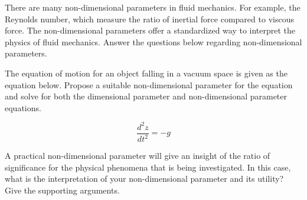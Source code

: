 \question{}\label{Q}

\listbeginx	%

	\item \label{a} There are many non-dimensional parameters in fluid mechanics. For example, the Reynolds number, which measure the ratio of inertial force compared to viscous force. The non-dimensional parameters offer a standardized way to interpret the physics of fluid mechanics. Answer the questions below regarding non-dimensional parameters.  
	
		
		\listbegin

\item \label{i} The equation of motion for an object falling in a vacuum space is given as the equation below. Propose a suitable non-dimensional parameter for the equation and solve for both the dimensional parameter and non-dimensional parameter equations.


\begin{equation}
\nonumber
\frac{d^{2}z}{dt^{2}} = -g
\end{equation}
		


	\item A practical non-dimensional parameter will give an insight of the ratio of significance for the physical phenomena that is being investigated. In this case, what is the interpretation of your non-dimensional parameter and its utility? Give the supporting arguments.  		


